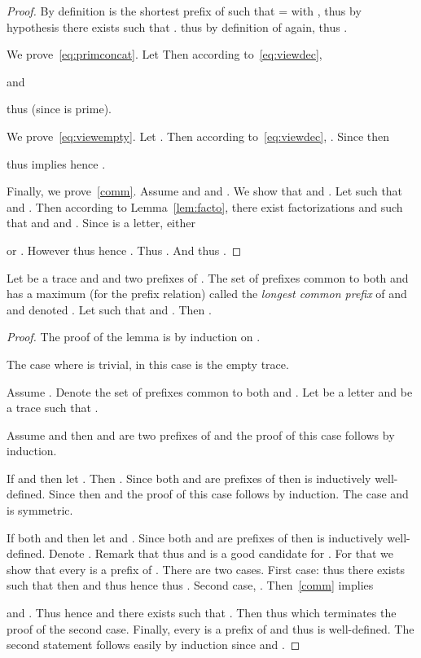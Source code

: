\documentclass[a4paper,UKenglish]{lipics-v2016}
\begin{document}
\begin{proof}
By definition  is the shortest prefix of 
such that = with 
,
thus by hypothesis there exists  such that .
 thus by definition of  again,
 thus .


We prove~\eqref{eq:primconcat}.
Let 
Then according to~\eqref{eq:viewdec}, 

and

thus 
 (since  is prime).

We prove~\eqref{eq:viewempty}.
Let .
Then according to~\eqref{eq:viewdec},
.
Since  then

thus 
implies 
hence .

Finally, we prove~\eqref{comm}.
Assume  and 
and .
We show that 
and .
Let  such that
 and .
Then according to Lemma~\ref{lem:facto},
there exist factorizations  and
 such that 
and  and .
Since  is a letter, either 

or
.
However 
thus  hence
.
Thus . And  thus .
\end{proof}



\begin{lemma}\label{lem:lcp}
Let  be a trace and  and  two prefixes of .
The set of prefixes common to both  and  has a maximum
(for the prefix relation) called the \emph{longest common prefix} of 
and  and denoted .
Let  such that 
and .
Then .
\end{lemma}
\begin{proof}
The proof of the lemma is by induction on .

The case where  is trivial,
in this case  is the empty trace.

Assume .
Denote  the set of prefixes common to both  and .
Let  be a letter and  be a trace such that .

Assume  and  then  and  are two prefixes of 
and the proof of this case follows by induction.

If  and  then let .
Then . Since both  and  are prefixes of
 then  is inductively well-defined.
Since  then  and the proof 
of this case follows by induction.
The case  and  is symmetric.

If both  and  then let  and .
Since both  and  are prefixes of
 then  is inductively well-defined. 
Denote .
Remark that  thus 
and  is a good candidate for . 
For that we show that every  is a prefix of .
There are two cases.
First case:  thus there exists  such that  then  and 
thus  hence  thus .
Second case, . Then~\eqref{comm} implies

and
.
Thus  hence
 and there exists  such that .
Then 
thus   which terminates the proof of the second case.
Finally, every  is a prefix of  and 
thus  is well-defined.
The second statement follows easily by induction
since  and .
\end{proof}
\end{document}
